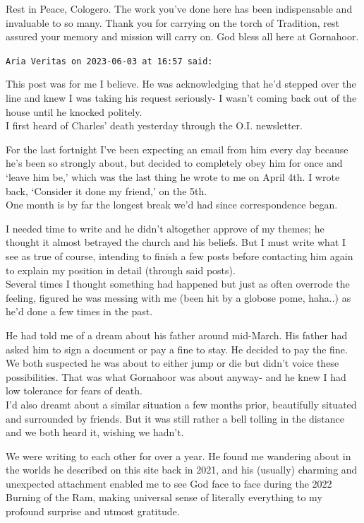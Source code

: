 \begin{footnotesize}
\begin{sffamily}
Rest in Peace, Cologero. The work you've done here has been indispensable and invaluable to so many. Thank you for carrying on the torch of Tradition, rest assured your memory and mission will carry on. God bless all here at Gornahoor.

\hfill

\texttt{Aria Veritas on 2023-06-03 at 16:57 said:}

This post was for me I believe. He was acknowledging that he'd stepped over the line and knew I was taking his request seriously- I wasn't coming back out of the house until he knocked politely.\\ I first heard of Charles' death yesterday through the O.I. newsletter.

For the last fortnight I've been expecting an email from him every day because he's been so strongly about, but decided to completely obey him for once and `leave him be,' which was the last thing he wrote to me on April 4th. I wrote back, `Consider it done my friend,' on the 5th.\\ One month is by far the longest break we'd had since correspondence began.

I needed time to write and he didn't altogether approve of my themes; he thought it almost betrayed the church and his beliefs. But I must write what I see as true of course, intending to finish a few posts before contacting him again to explain my position in detail (through said posts).\\ Several times I thought something had happened but just as often overrode the feeling, figured he was messing with me (been hit by a globose pome, haha..) as he'd done a few times in the past.

He had told me of a dream about his father around mid-March. His father had asked him to sign a document or pay a fine to stay. He decided to pay the fine. We both suspected he was about to either jump or die but didn't voice these possibilities. That was what Gornahoor was about anyway- and he knew I had low tolerance for fears of death.\\ I'd also dreamt about a similar situation a few months prior, beautifully situated and surrounded by friends. But it was still rather a bell tolling in the distance and we both heard it, wishing we hadn't.

We were writing to each other for over a year. He found me wandering about in the worlds he described on this site back in 2021, and his (usually) charming and unexpected attachment enabled me to see God face to face during the 2022 Burning of the Ram, making universal sense of literally everything to my profound surprise and utmost gratitude.


\end{sffamily}
\end{footnotesize}

